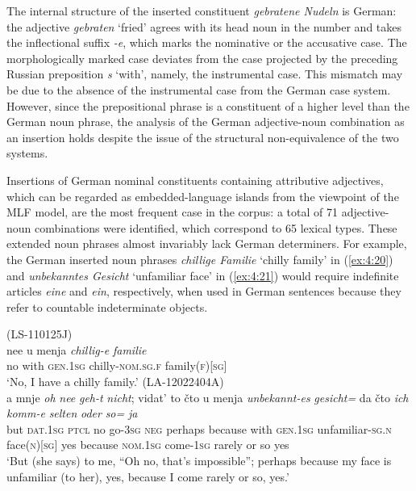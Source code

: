 \noindent The internal structure of the inserted constituent \textit{gebratene Nudeln} is German: the adjective \textit{gebraten} `fried' agrees with its head noun in the number and takes the inflectional suffix \textit{-e}, which marks the nominative or the accusative case. The morphologically marked case deviates from the case projected by the preceding Russian preposition \textit{s} `with', namely, the instrumental case. This mismatch may be due to the absence of the instrumental case from the German case system.  However, since the prepositional phrase is a constituent of a higher level than the German noun phrase, the analysis of the German adjective-noun combination as an insertion holds despite the issue of the structural non-equivalence of the two systems.

Insertions of German nominal constituents containing attributive adjectives, which can be regarded as embedded-language islands from the viewpoint of the MLF model, are the most frequent case in the corpus: a total of 71 adjective-noun combinations were identified, which correspond to 65 lexical types. These extended noun phrases almost invariably lack German determiners. For example, the German inserted noun phrases \textit{chillige Familie} `chilly family' in (\ref{ex:4:20}) and  \textit{unbekanntes Gesicht} `unfamiliar face' in (\ref{ex:4:21}) would require indefinite articles \textit{eine} and \textit{ein}, respectively, when used in German sentences because they refer to countable indeterminate objects.

\ea
\label{ex:4:20}
(LS-110125J)\\
 \gll nee u menja \textit{chillig-e} \textit{familie}\\
 no with \textsc{gen.1sg} chilly-\textsc{nom.sg.f} family(\textsc{f})[\textsc{sg}]\\
\glt `No, I have a chilly family.'
\ex
\label{ex:4:21}
(LA-12022404A)\\
 \gll a mnje \textit{oh} \textit{nee} \textit{geh-t} \textit{nicht}; vidat' {to čto} u menja \textit{unbekannt-es} \textit{gesicht=}  da čto \textit{ich} \textit{komm-e} \textit{selten} \textit{oder} \textit{so=} \textit{ja}\\ 	
 but \textsc{dat.1sg} \textsc{ptcl} no go-\textsc{3sg} \textsc{neg} perhaps because with \textsc{gen.1sg} unfamiliar-\textsc{sg.n} face(\textsc{n})[\textsc{sg}] yes because \textsc{nom.1sg} come-\textsc{1sg} rarely or so yes\\ 
\glt `But (she says) to me, ``Oh no, that's impossible''; perhaps because my face is unfamiliar (to her), yes, because I come rarely or so, yes.'
\z


